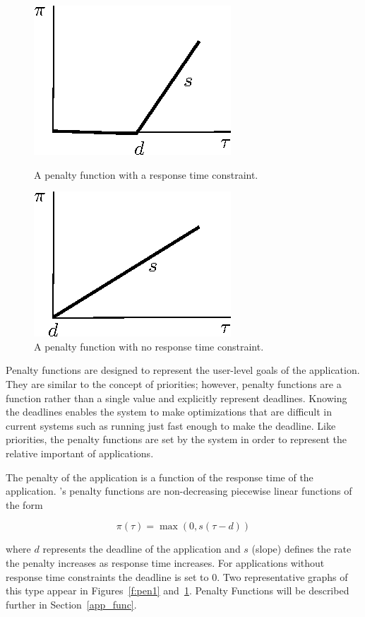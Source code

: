 \begin{figure}[hb]
\parbox{1.6in}{
\includegraphics*{Penalty1.eps}
\caption{\label{f:pen1}A penalty function with a response time constraint.}
}
\hspace{\fill}
\parbox{1.6in}{
\includegraphics*{Penalty2.eps}
\caption{\label{f:pen2}A penalty function with no response time constraint.}
}
\end{figure}

Penalty functions are designed to represent the user-level goals of the application. They are similar to the concept of priorities; however, penalty functions are a function rather than a single value and explicitly represent deadlines.  Knowing the deadlines enables the system to make optimizations that are difficult in current systems such as running just fast enough to make the deadline. Like priorities, the penalty functions are set by the system in order to represent the relative important of applications.

The penalty of the application is a function of the response time of the application.  \pacora's penalty functions are non-decreasing piecewise linear functions of the form

\begin{equation}\label{pen_eq}
\pi(\tau) = \max(0, s(\tau - d))
\end{equation}

where $d$ represents the deadline of the application and $s$ (slope) defines the rate the penalty increases as response time increases. For applications without response time constraints the deadline is set to $0$. Two representative graphs of this type appear in Figures~\ref{f:pen1} and~\ref{f:pen2}. Penalty Functions will be described further in Section~\ref{app_func}.

